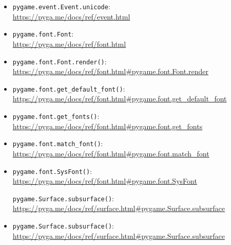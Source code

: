 \begin{pygbox}
\begin{itemize}
	\item \texttt{pygame.event.Event.unicode}:
	\\ \url{https://pyga.me/docs/ref/event.html}
	
	\item \texttt{pygame.font.Font}:
	\\ \url{https://pyga.me/docs/ref/font.html}
	
	\item \texttt{pygame.font.Font.render()}:
	\\ \url{https://pyga.me/docs/ref/font.html#pygame.font.Font.render}

	\item \texttt{pygame.font.get\_default\_font()}:
	\\ \url{https://pyga.me/docs/ref/font.html#pygame.font.get_default_font}
	
	\item \texttt{pygame.font.get\_fonts()}:
	\\ \url{https://pyga.me/docs/ref/font.html#pygame.font.get_fonts}
	
	\item \texttt{pygame.font.match\_font()}:
	\\
	\url{https://pyga.me/docs/ref/font.html#pygame.font.match_font}
	
	\item \texttt{pygame.font.SysFont()}:
	\\ \url{https://pyga.me/docs/ref/font.html#pygame.font.SysFont}

	\texttt{pygame.Surface.subsurface()}:
	\\ \url{https://pyga.me/docs/ref/surface.html#pygame.Surface.subsurface}
	
	\item \texttt{pygame.Surface.subsurface()}:
	\\ \url{https://pyga.me/docs/ref/surface.html#pygame.Surface.subsurface}
\end{itemize}
\end{pygbox}



